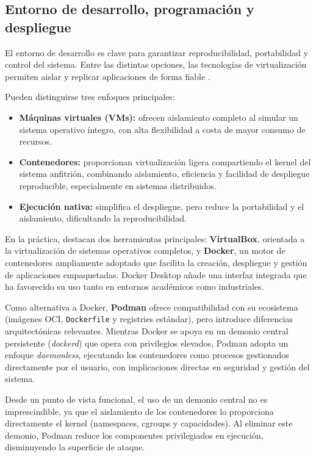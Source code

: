 \documentclass{report}
\begin{document}
\subsection{Entorno de desarrollo, programación y despliegue}

El entorno de desarrollo es clave para garantizar reproducibilidad, portabilidad y control del sistema. Entre las distintas opciones, las tecnologías de virtualización permiten aislar y replicar aplicaciones de forma fiable \cite{turnbull2014docker}.

Pueden distinguirse tres enfoques principales:
\begin{itemize}
    \item \textbf{Máquinas virtuales (VMs):} ofrecen aislamiento completo al simular un sistema operativo íntegro, con alta flexibilidad a costa de mayor consumo de recursos.
    \item \textbf{Contenedores:} proporcionan virtualización ligera compartiendo el kernel del sistema anfitrión, combinando aislamiento, eficiencia y facilidad de despliegue reproducible, especialmente en sistemas distribuidos.
    
    \item \textbf{Ejecución nativa:} simplifica el despliegue, pero reduce la portabilidad y el aislamiento, dificultando la reproducibilidad.
\end{itemize}


En la práctica, destacan dos herramientas principales: \textbf{VirtualBox}, orientada a la virtualización de sistemas operativos completos, y \textbf{Docker}, un motor de contenedores ampliamente adoptado que facilita la creación, despliegue y gestión de aplicaciones empaquetadas. Docker Desktop añade una interfaz integrada que ha favorecido su uso tanto en entornos académicos como industriales.

Como alternativa a Docker, \textbf{Podman} ofrece compatibilidad con su ecosistema (imágenes OCI, \texttt{Dockerfile} y registries estándar), pero introduce diferencias arquitectónicas relevantes. Mientras Docker se apoya en un demonio central persistente (\textit{dockerd}) que opera con privilegios elevados, Podman adopta un enfoque \textit{daemonless}, ejecutando los contenedores como procesos gestionados directamente por el usuario, con implicaciones directas en seguridad y gestión del sistema.

Desde un punto de vista funcional, el uso de un demonio central no es imprescindible, ya que el aislamiento de los contenedores lo proporciona directamente el kernel (namespaces, cgroups y capacidades). Al eliminar este demonio, Podman reduce los componentes privilegiados en ejecución, disminuyendo la superficie de ataque.
\end{document}
